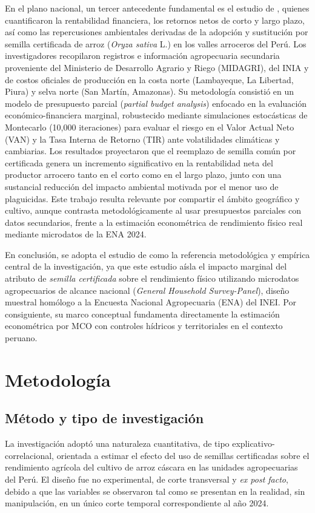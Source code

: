 \documentclass[11pt,a4paper,twocolumn]{article}
\begin{document}
En el plano nacional, un tercer antecedente fundamental es el estudio de \citet{matallana2022}, quienes cuantificaron la rentabilidad financiera, los retornos netos de corto y largo plazo, así como las repercusiones ambientales derivadas de la adopción y sustitución por semilla certificada de arroz (\textit{Oryza sativa} L.) en los valles arroceros del Perú. Los investigadores recopilaron registros e información agropecuaria secundaria proveniente del Ministerio de Desarrollo Agrario y Riego (MIDAGRI), del INIA y de costos oficiales de producción en la costa norte (Lambayeque, La Libertad, Piura) y selva norte (San Martín, Amazonas). Su metodología consistió en un modelo de presupuesto parcial (\textit{partial budget analysis}) enfocado en la evaluación económico-financiera marginal, robustecido mediante simulaciones estocásticas de Montecarlo (10,000 iteraciones) para evaluar el riesgo en el Valor Actual Neto (VAN) y la Tasa Interna de Retorno (TIR) ante volatilidades climáticas y cambiarias. Los resultados proyectaron que el reemplazo de semilla común por certificada genera un incremento significativo en la rentabilidad neta del productor arrocero tanto en el corto como en el largo plazo, junto con una sustancial reducción del impacto ambiental motivada por el menor uso de plaguicidas. Este trabajo resulta relevante por compartir el ámbito geográfico y cultivo, aunque contrasta metodológicamente al usar presupuestos parciales con datos secundarios, frente a la estimación econométrica de rendimiento físico real mediante microdatos de la ENA 2024.

En conclusión, se adopta el estudio de \citet{takeshima2025} como la referencia metodológica y empírica central de la investigación, ya que este estudio aísla el impacto marginal del atributo de \textit{semilla certificada} sobre el rendimiento físico utilizando microdatos agropecuarios de alcance nacional (\textit{General Household Survey-Panel}), diseño muestral homólogo a la Encuesta Nacional Agropecuaria (ENA) del INEI. Por consiguiente, su marco conceptual fundamenta directamente la estimación econométrica por MCO con controles hídricos y territoriales en el contexto peruano.

\clearpage
\section{Metodología}

\subsection{Método y tipo de investigación}
La investigación adoptó una naturaleza cuantitativa, de tipo explicativo-correlacional, orientada a estimar el efecto del uso de semillas certificadas sobre el rendimiento agrícola del cultivo de arroz cáscara en las unidades agropecuarias del Perú. El diseño fue no experimental, de corte transversal y \textit{ex post facto}, debido a que las variables se observaron tal como se presentan en la realidad, sin manipulación, en un único corte temporal correspondiente al año 2024.
\end{document}
